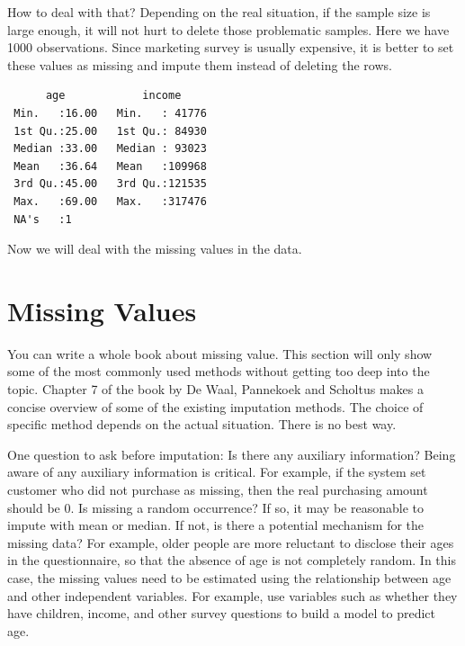 \documentclass[12pt,]{krantz}
\makeatletter
\newenvironment{Shaded}{\begin{snugshade}}{\end{snugshade}}
\newcommand{\KeywordTok}[1]{\textcolor[rgb]{0.27,0.27,0.27}{\textbf{#1}}}
\newcommand{\DataTypeTok}[1]{\textcolor[rgb]{0.27,0.27,0.27}{#1}}
\newcommand{\DecValTok}[1]{\textcolor[rgb]{0.06,0.06,0.06}{#1}}
\newcommand{\StringTok}[1]{\textcolor[rgb]{0.5,0.5,0.5}{#1}}
\newcommand{\CommentTok}[1]{\textcolor[rgb]{0.37,0.37,0.37}{\textit{#1}}}
\newcommand{\OtherTok}[1]{\textcolor[rgb]{0.37,0.37,0.37}{#1}}
\newcommand{\OperatorTok}[1]{\textcolor[rgb]{0.43,0.43,0.43}{\textbf{#1}}}
\newcommand{\NormalTok}[1]{#1}
\newenvironment{kframe}{%
\medskip{}
\setlength{\fboxsep}{.8em}
 \def\at@end@of@kframe{}%
 \ifinner\ifhmode%
  \def\at@end@of@kframe{\end{minipage}}%
  \begin{minipage}{\columnwidth}%
 \fi\fi%
 \def\FrameCommand##1{\hskip\@totalleftmargin \hskip-\fboxsep
 \colorbox{shadecolor}{##1}\hskip-\fboxsep
     \hskip-\linewidth \hskip-\@totalleftmargin \hskip\columnwidth}%
 \MakeFramed {\advance\hsize-\width
   \@totalleftmargin\z@ \linewidth\hsize
   \@setminipage}}%
 {\par\unskip\endMakeFramed%
 \at@end@of@kframe}
\renewenvironment{Shaded}{\begin{kframe}}{\end{kframe}}
\theoremstyle{definition}
\theoremstyle{definition}
\theoremstyle{definition}
\theoremstyle{remark}
\makeatother
\begin{document}
How to deal with that? Depending on the real situation, if the sample
size is large enough, it will not hurt to delete those problematic
samples. Here we have 1000 observations. Since marketing survey is
usually expensive, it is better to set these values as missing and
impute them instead of deleting the rows.

\begin{Shaded}
\end{Shaded}

\begin{verbatim}
      age            income      
 Min.   :16.00   Min.   : 41776  
 1st Qu.:25.00   1st Qu.: 84930  
 Median :33.00   Median : 93023  
 Mean   :36.64   Mean   :109968  
 3rd Qu.:45.00   3rd Qu.:121535  
 Max.   :69.00   Max.   :317476  
 NA's   :1  
\end{verbatim}

Now we will deal with the missing values in the data.

\section{Missing Values}\label{missing-values}

You can write a whole book about missing value. This section will only
show some of the most commonly used methods without getting too deep
into the topic. Chapter 7 of the book by De Waal, Pannekoek and Scholtus
\citep{Ton2011} makes a concise overview of some of the existing
imputation methods. The choice of specific method depends on the actual
situation. There is no best way.

One question to ask before imputation: Is there any auxiliary
information? Being aware of any auxiliary information is critical. For
example, if the system set customer who did not purchase as missing,
then the real purchasing amount should be 0. Is missing a random
occurrence? If so, it may be reasonable to impute with mean or median.
If not, is there a potential mechanism for the missing data? For
example, older people are more reluctant to disclose their ages in the
questionnaire, so that the absence of age is not completely random. In
this case, the missing values need to be estimated using the
relationship between age and other independent variables. For example,
use variables such as whether they have children, income, and other
survey questions to build a model to predict age.
\end{document}
